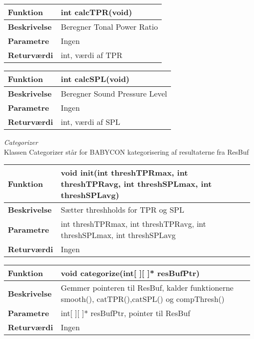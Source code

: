 \begin{center}
    \begin{tabular}{ | l | p{10cm} |}
    \hline
    \textbf{Funktion}	 	& int calcTPR(void)										\\ \hline
    \textbf{Beskrivelse} 	& Beregner Tonal Power Ratio							\\ \hline
    \textbf{Parametre}		& Ingen							 					    \\ \hline
    \textbf{Returværdi} 	& int, værdi af TPR					 					\\ \hline
    \end{tabular}
\end{center}

\begin{center}
    \begin{tabular}{ | l | p{10cm} |}
    \hline
    \textbf{Funktion}	 	& int calcSPL(void)										\\ \hline
    \textbf{Beskrivelse} 	& Beregner Sound Pressure Level							\\ \hline
    \textbf{Parametre}		& Ingen							 					    \\ \hline
    \textbf{Returværdi} 	& int, værdi af SPL					 					\\ \hline
    \end{tabular}
\end{center}

\textit{Categorizer} \\
Klassen Categorizer står for BABYCON kategorisering af resultaterne fra ResBuf

\begin{center}
    \begin{tabular}{ | l | p{10cm} |}
    \hline
    \textbf{Funktion}	 	& void init(int threshTPRmax, int threshTPRavg, int threshSPLmax, int threshSPLavg)										\\ \hline
    \textbf{Beskrivelse} 	& Sætter threshholds for TPR og SPL				\\ \hline
    \textbf{Parametre}		& int threshTPRmax, int threshTPRavg, int threshSPLmax, int threshSPLavg							 					    \\ \hline
    \textbf{Returværdi} 	& Ingen													\\ \hline
    \end{tabular}
\end{center}

\begin{center}
    \begin{tabular}{ | l | p{10cm} |}
    \hline
    \textbf{Funktion}	 	& void categorize(int[ ][ ]* resBufPtr)								\\ \hline
    \textbf{Beskrivelse} 	& Gemmer pointeren til ResBuf, kalder funktionerne smooth(), catTPR(),catSPL() og compThresh()					\\ \hline
    \textbf{Parametre}		& int[ ][ ]* resBufPtr, pointer til ResBuf							 					    \\ \hline
    \textbf{Returværdi} 	& Ingen			\\ \hline
    \end{tabular}
\end{center}

